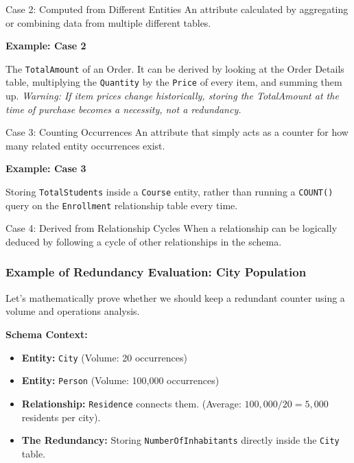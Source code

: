 \vs

\begin{defbox}{Case 2: Computed from Different Entities}
An attribute calculated by aggregating or combining data from multiple different tables.
\end{defbox}

\vspace{0.2cm}
\begin{example}{\textbf{Example: Case 2}}

The \texttt{TotalAmount} of an Order. It can be derived by looking at the Order Details table, multiplying the \texttt{Quantity} by the \texttt{Price} of every item, and summing them up. \textit{Warning: If item prices change historically, storing the TotalAmount at the time of purchase becomes a necessity, not a redundancy.}
\end{example}

\begin{defbox}{Case 3: Counting Occurrences}
An attribute that simply acts as a counter for how many related entity occurrences exist.
\end{defbox}

\vspace{0.2cm}
\begin{example}{\textbf{Example: Case 3}}

Storing \texttt{TotalStudents} inside a \texttt{Course} entity, rather than running a \texttt{COUNT()} query on the \texttt{Enrollment} relationship table every time.
\end{example}

\vs
\begin{defbox}{Case 4: Derived from Relationship Cycles}
When a relationship can be logically deduced by following a cycle of other relationships in the schema.
\end{defbox}

\subsubsection{Example of Redundancy Evaluation: City Population}
Let's mathematically prove whether we should keep a redundant counter using a volume and operations analysis.

\textbf{Schema Context:}
\begin{itemize}
    \item \textbf{Entity:} \texttt{City} (Volume: 20 occurrences)
    \item \textbf{Entity:} \texttt{Person} (Volume: 100,000 occurrences)
    \item \textbf{Relationship:} \texttt{Residence} connects them. (Average: $100,000 / 20 = 5,000$ residents per city).
    \item \textbf{The Redundancy:} Storing \texttt{NumberOfInhabitants} directly inside the \texttt{City} table.
\end{itemize}

